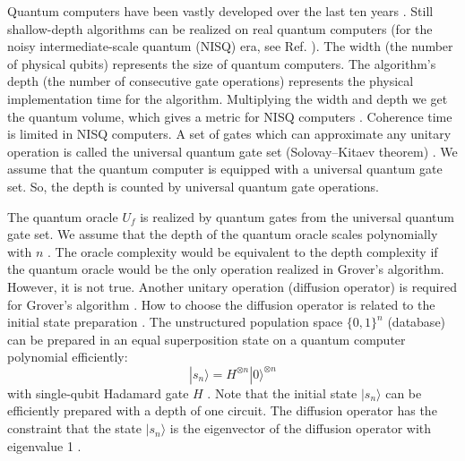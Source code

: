 \documentclass[%
 twocolumn,
 10pt,
 superscriptaddress,
 longbibliography,
 amsmath,amssymb,
 aps,
 pra,
floatfix,
]{revtex4-1}
\begin{document}
Quantum computers have been vastly developed over the last ten years \cite{Barends14,BHLSL16,FMLLDM17,Arute19}. Still shallow-depth algorithms can be realized on real quantum computers (for the noisy intermediate-scale quantum (NISQ) era, see Ref. \cite{Preskill18}). The width (the number of physical qubits) represents the size of quantum computers. The algorithm's depth (the number of consecutive  gate operations) represents the physical implementation time for the algorithm. Multiplying the width and depth we get the quantum volume, which gives a metric for NISQ computers \cite{CBSNG19}. Coherence time is limited in NISQ computers. A set of gates which can approximate any unitary operation is called the universal quantum gate set (Solovay–Kitaev theorem) \cite{NC10}. We assume that the quantum computer is equipped with a universal quantum gate set. So, the depth is counted by universal quantum gate operations. 

The quantum oracle $U_f$ is realized by quantum gates from the universal quantum gate set. We assume that the depth of the quantum oracle scales polynomially with $n$ \cite{FMLLDM17}. The oracle complexity would be equivalent to the depth complexity if the quantum oracle would be the only operation realized in Grover's algorithm. However, it is not true. Another unitary operation (diffusion operator) is required for Grover's algorithm \cite{Grover97,GK17}. How to choose the diffusion operator is related to the initial state preparation \cite{Grover98,BHMT00}. The unstructured population space $\{0,1\}^n$ (database) can be prepared in an equal superposition state on a quantum computer polynomial efficiently:
\begin{equation}
\label{def s n}
    |s_n\rangle=H^{\otimes n}|0\rangle^{\otimes n}
\end{equation}
with single-qubit Hadamard gate $H$ \cite{NC10}. Note that the initial state $|s_n\rangle$ can be efficiently prepared with a depth of one circuit. The diffusion operator has the constraint that the state $|s_n\rangle$ is the eigenvector of the diffusion operator with eigenvalue 1 \cite{Tulsi12,Tulsi15}. 
\end{document}
